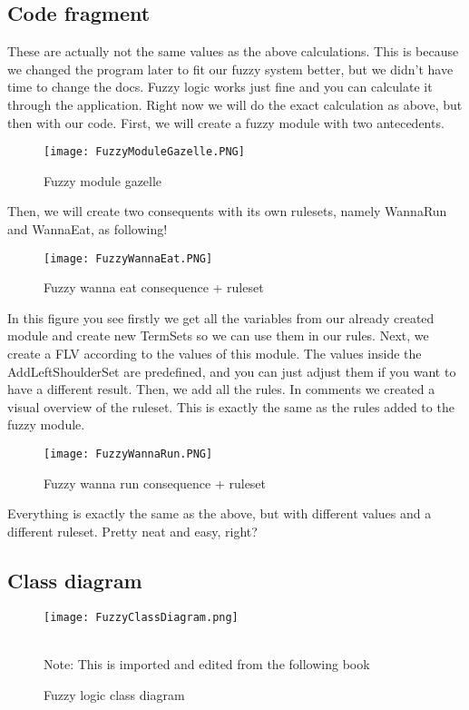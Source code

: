 \subsection{Code fragment}
These are actually not the same values as the above calculations.
This is because we changed the program later to fit our fuzzy system better, but we didn't have time to change the docs.
Fuzzy logic works just fine and you can calculate it through the application.
Right now we will do the exact calculation as above, but then with our code.
First, we will create a fuzzy module with two antecedents.
\newpage
\begin{figure}[ht]
    \begin{center}
        \texttt{[image: FuzzyModuleGazelle.PNG]}
    \end{center}
    \caption{Fuzzy module gazelle}
    \label{fig:FuzzyModuleGazelle}
\end{figure}
Then, we will create two consequents with its own rulesets, namely WannaRun and WannaEat, as following!
\newpage
\begin{figure}[ht]
    \begin{center}
        \texttt{[image: FuzzyWannaEat.PNG]}
    \end{center}
    \caption{Fuzzy wanna eat consequence + ruleset}
    \label{fig:FuzzyWannaEat}
\end{figure}
In this figure you see firstly we get all the variables from our already created module and create new TermSets so we can use them in our rules.
Next, we create a FLV according to the values of this module.
The values inside the AddLeftShoulderSet are predefined, and you can just adjust them if you want to have a different result.
Then, we add all the rules.
In comments we created a visual overview of the ruleset.
This is exactly the same as the rules added to the fuzzy module.
\newpage
\begin{figure}[ht]
    \begin{center}
        \texttt{[image: FuzzyWannaRun.PNG]}
    \end{center}
    \caption{Fuzzy wanna run consequence + ruleset}
    \label{fig:FuzzyWannaRun}
\end{figure}
Everything is exactly the same as the above, but with different values and a different ruleset.
Pretty neat and easy, right?
\newpage
\subsection{Class diagram}
\begin{figure}[ht]
    \begin{center}
        \texttt{[image: FuzzyClassDiagram.png]}
    \end{center}
    \begin{center}
    \caption{Fuzzy logic class diagram}
    \\Note: This is imported and edited from the following book \cite{pgaie} %
    \end{center}
    \label{fig:FuzzyClassDiagram}
\end{figure}
\newpage
\newpage
